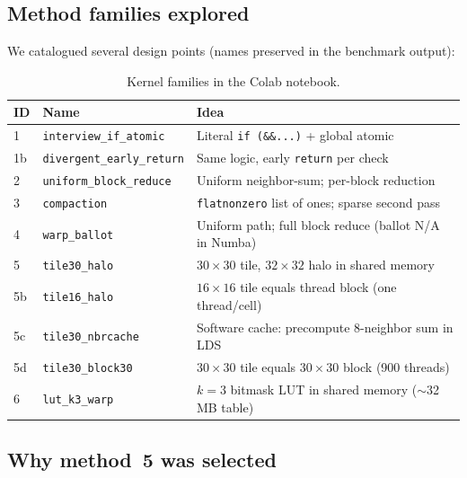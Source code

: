 \documentclass[11pt,a4paper]{article}
\begin{document}
\subsection{Method families explored}

We catalogued several design points (names preserved in the benchmark output):

\begin{table}[h]
  \centering
  \caption{Kernel families in the Colab notebook.}
  \label{tab:methods-colab}
  \begin{tabular}{@{}llp{7.2cm}@{}}
    \toprule
    ID & Name & Idea \\
    \midrule
    1  & \texttt{interview\_if\_atomic} & Literal \texttt{if (\&\&...)} + global atomic \\
    1b & \texttt{divergent\_early\_return} & Same logic, early \texttt{return} per check \\
    2  & \texttt{uniform\_block\_reduce} & Uniform neighbor-sum; per-block reduction \\
    3  & \texttt{compaction} & \texttt{flatnonzero} list of ones; sparse second pass \\
    4  & \texttt{warp\_ballot} & Uniform path; full block reduce (ballot N/A in Numba) \\
    5  & \texttt{tile30\_halo} & $30{\times}30$ tile, $32{\times}32$ halo in shared memory \\
    5b & \texttt{tile16\_halo} & $16{\times}16$ tile equals thread block (one thread/cell) \\
    5c & \texttt{tile30\_nbrcache} & Software cache: precompute 8-neighbor sum in LDS \\
    5d & \texttt{tile30\_block30} & $30{\times}30$ tile equals $30{\times}30$ block (900 threads) \\
    6  & \texttt{lut\_k3\_warp} & $k{=}3$ bitmask LUT in shared memory ($\sim$32\,MB table) \\
    \bottomrule
  \end{tabular}
\end{table}

\subsection{Why method~5 was selected}
\end{document}
